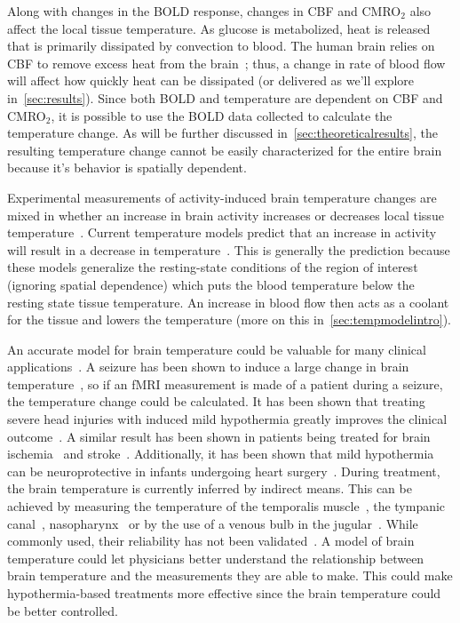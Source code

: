 Along with changes in the BOLD response, changes in CBF and CMRO$_2$ also affect the local tissue temperature. As glucose is metabolized, heat is released that is primarily dissipated by convection to blood.  The human brain relies on CBF to remove excess heat from the brain~\citep{karbowski2009}; thus, a change in rate of blood flow will affect how quickly heat can be dissipated (or delivered as we'll explore in~\cref{sec:results}).  Since both BOLD and temperature are dependent on CBF and CMRO$_2$, it is possible to use the BOLD data collected to calculate the temperature change. As will be further discussed in~\cref{sec:theoreticalresults}, the resulting temperature change cannot be easily characterized for the entire brain because it's behavior is spatially dependent.

Experimental measurements of activity-induced brain temperature changes are mixed in whether an increase in brain activity increases or decreases local tissue temperature~\citep{mcelligott,kiyatkin,zeschke,george,tachibana}. Current temperature models predict that an increase in activity will result in a decrease in temperature~\citep{sotero2011,yablonskiy,trubel}.  This is generally the prediction because these models generalize the resting-state conditions of the region of interest (ignoring spatial dependence) which puts the blood temperature below the resting state tissue temperature.  An increase in blood flow then acts as a coolant for the tissue and lowers the temperature (more on this in~\cref{sec:tempmodelintro}).

An accurate model for brain temperature could be valuable for many clinical applications~\citep{bertolizio2011}.  A seizure has been shown to induce a large change in brain temperature~\citep{trubel2004}, so if an fMRI measurement is made of a patient during a seizure, the temperature change could be calculated.  It has been shown that treating severe head injuries with induced mild hypothermia greatly improves the clinical outcome~\citep{soukup2002}.  A similar result has been shown in patients being treated for brain ischemia~\citep{maher1993,ginsberg1992} and stroke~\citep{krieger2001}.  Additionally, it has been shown that mild hypothermia can be neuroprotective in infants undergoing heart surgery~\citep{dominguez2003}. During treatment, the brain temperature is currently inferred by indirect means.  This can be achieved by measuring the temperature of the temporalis muscle~\citep{suehiro2003}, the tympanic canal~\citep{baker1972,shiraki1988}, nasopharynx~\citep{stecker2001} or by the use of a venous bulb in the jugular~\citep{rumana1998,bissonnette2000}. While commonly used, their reliability has not been validated~\citep{shiraki1988,bissonnette2000}. A model of brain temperature could let physicians better understand the relationship between brain temperature and the measurements they are able to make. This could make hypothermia-based treatments more effective since the brain temperature could be better controlled.

